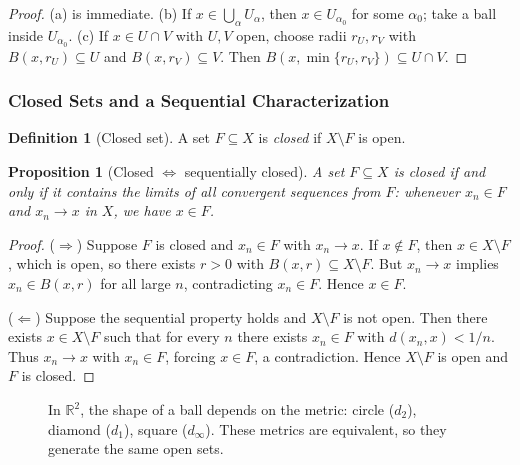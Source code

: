 \documentclass[12pt]{article}
\numberwithin{equation}{section}
\newcommand{\RR}{\mathbb{R}}
\theoremstyle{plain}
\newtheorem{proposition}[theorem]{Proposition}
\theoremstyle{definition}
\newtheorem{definition}[theorem]{Definition}
\theoremstyle{remark}
\begin{document}
\begin{proof}
(a) is immediate.
(b) If $x\in\bigcup_\alpha U_\alpha$, then $x\in U_{\alpha_0}$ for some $\alpha_0$; take a ball inside $U_{\alpha_0}$.
(c) If $x\in U\cap V$ with $U,V$ open, choose radii $r_U,r_V$ with $B(x,r_U)\subseteq U$ and $B(x,r_V)\subseteq V$.
Then $B(x,\min\{r_U,r_V\})\subseteq U\cap V$.
\end{proof}

\subsubsection{Closed Sets and a Sequential Characterization}

\begin{definition}[Closed set]\label{ms:def:closed-set}
A set $F\subseteq X$ is \emph{closed} if $X\setminus F$ is open.
\end{definition}

\begin{proposition}[Closed $\Leftrightarrow$ sequentially closed]\label{ms:prop:closed-seq}
A set $F\subseteq X$ is closed if and only if it contains the limits of all convergent sequences from $F$:
whenever $x_n\in F$ and $x_n\to x$ in $X$, we have $x\in F$.
\end{proposition}

\begin{proof}
($\Rightarrow$) Suppose $F$ is closed and $x_n\in F$ with $x_n\to x$.
If $x\notin F$, then $x\in X\setminus F$, which is open, so there exists $r>0$ with $B(x,r)\subseteq X\setminus F$.
But $x_n\to x$ implies $x_n\in B(x,r)$ for all large $n$, contradicting $x_n\in F$. Hence $x\in F$.

($\Leftarrow$) Suppose the sequential property holds and $X\setminus F$ is not open.
Then there exists $x\in X\setminus F$ such that for every $n$ there exists $x_n\in F$ with $d(x_n,x)<1/n$.
Thus $x_n\to x$ with $x_n\in F$, forcing $x\in F$, a contradiction. Hence $X\setminus F$ is open and $F$ is closed.
\end{proof}

\begin{figure}[H]
\centering
{}
\caption{In $\RR^2$, the shape of a ball depends on the metric: circle ($d_2$), diamond ($d_1$), square ($d_\infty$). These metrics are equivalent, so they generate the same open sets.}
\end{figure}
\end{document}
